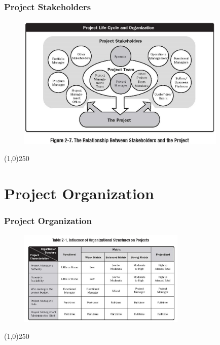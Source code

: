 \begin{frame}
\frametitle{Project Stakeholders}
 \begin{figure}
 	\centering
 		\includegraphics[width = 10cm]{images/Fig2-7.jpg}
 	\label{fig:2-7}
 \end{figure}
\end{frame}
\begin{center}\line(1,0){250}\end{center}






\section{Project Organization}


\begin{frame}
\frametitle{Project Organization}
 \begin{figure}
 	\centering
 		\includegraphics[width = 8cm]{images/tbl2-1.jpg}
 	\label{tbl:2-1}
 \end{figure}
\end{frame}
\begin{center}\line(1,0){250}\end{center}



